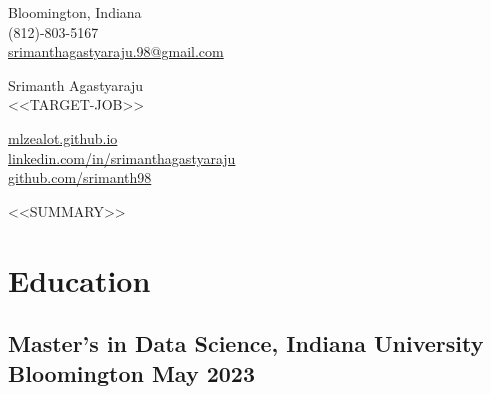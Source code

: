 \documentclass[a4,10pt]{article}
\begin{document}
\begin{center}
    \begin{minipage}[b]{0.24\textwidth}
            \small Bloomington, Indiana \\
            \small (812)-803-5167 \\
            \small \href{mailto:srimanthagastyaraju.98@gmail.com}{srimanthagastyaraju.98@gmail.com}
    \end{minipage}%
    \begin{minipage}[b]{0.5\textwidth}
            \centering
            {\HUGE Srimanth Agastyaraju} \\ %
            \vspace{0.1cm}
            {\color{UI_blue} \Large{<<TARGET-JOB>>}} \\
    \end{minipage}%
    \begin{minipage}[b]{0.24\textwidth}
            \flushright \small  %
            {\href{https://mlzealot.github.io/}{mlzealot.github.io}} \\
            {\href{https://www.linkedin.com/in/srimanthagastyaraju/}{linkedin.com/in/srimanthagastyaraju}} \\
            \href{https://github.com/srimanth98}{github.com/srimanth98}
    \end{minipage}   
    
\vspace{-0.15cm} 
{\color{UI_blue} \hrulefill}
\end{center}
\vspace{-0.2cm}
<<SUMMARY>>
\vspace{-0.2cm}



\section{Education }
\subsection*{Master’s in Data Science, {\normalsize \normalfont Indiana University Bloomington} \hfill May 2023} 
\vspace{0.1cm}
\end{document}
